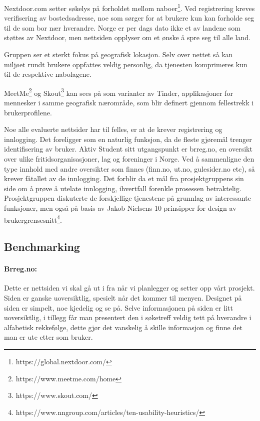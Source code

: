 \vspace{5mm} %

Nextdoor.com setter søkelys på forholdet mellom naboer\footnote{https://global.nextdoor.com/}. Ved registrering kreves verifisering av bostedsadresse, noe som sørger for at brukere kun kan forholde seg til de som bor nær hverandre. Norge er per dags dato ikke et av landene som støttes av Nextdoor, men nettsiden opplyser om et ønske å spre seg til alle land.

\vspace{5mm} %

Gruppen ser et sterkt fokus på geografisk lokasjon. Selv over nettet så kan miljøet rundt brukere oppfattes veldig personlig, da tjenesten komprimeres kun til de respektive nabolagene.

\vspace{5mm} %

MeetMe\footnote{https://www.meetme.com/home} og Skout\footnote{https://www.skout.com/} kan sees på som varianter av Tinder, applikasjoner for mennesker i samme geografisk nærområde, som blir definert gjennom fellestrekk i brukerprofilene.

\vspace{5mm} %

Noe alle evaluerte nettsider har til felles, er at de krever registrering og innlogging. Det foreligger som en naturlig funksjon, da de fleste gjøremål trenger identifisering av bruker. Aktiv Student sitt utgangspunkt er brreg.no, en oversikt over ulike fritidsorganisasjoner, lag og foreninger i Norge. Ved å sammenligne den type innhold med andre oversikter som finnes (finn.no, ut.no, gulesider.no etc), så krever fåtallet av de innlogging. Det forblir da et mål fra prosjektgruppens sin side om å prøve å utelate innlogging, ihvertfall forenkle prosessen betraktelig. Prosjektgruppen diskuterte de forskjellige tjenestene på grunnlag av interessante funksjoner, men også på basis av Jakob Nielsens 10 prinsipper for design av brukergrensesnitt\footnote{https://www.nngroup.com/articles/ten-usability-heuristics/}.


\subsection{Benchmarking}
\label{section:benchmarking}

\paragraph{Brreg.no:}
Dette er nettsiden vi skal gå ut i fra når vi planlegger og setter opp vårt prosjekt.
Siden er ganske uoversiktlig, spesielt når det kommer til menyen.
Designet på siden er simpelt, noe kjedelig og se på.
Selve informasjonen på siden er litt uoversiktlig, i tillegg får man presentert den i søketreff veldig tett på hverandre i alfabetisk rekkefølge, dette gjør det vanskelig å skille informasjon og finne det man er ute etter som bruker.

